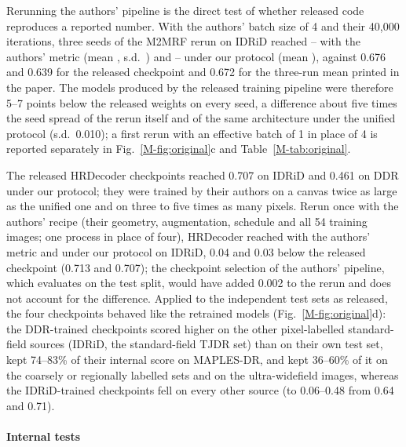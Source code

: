 Rerunning the authors' pipeline is the direct test of whether released code reproduces a reported number. With the authors' batch size of 4 and their 40,000 iterations, three seeds of the M2MRF rerun on IDRiD reached -- with the authors' metric (mean , s.d.\ ) and -- under our protocol (mean ), against 0.676 and 0.639 for the released checkpoint and 0.672 for the three-run mean printed in the paper. The models produced by the released training pipeline were therefore 5--7 points below the released weights on every seed, a difference about five times the seed spread of the rerun itself and of the same architecture under the unified protocol (s.d.\ 0.010); a first rerun with an effective batch of 1 in place of 4 is reported separately in Fig.~\ref{M-fig:original}c and Table~\ref{M-tab:original}.

The released HRDecoder checkpoints reached 0.707 on IDRiD and 0.461 on DDR under our protocol; they were trained by their authors on a canvas twice as large as the unified one and on three to five times as many pixels. Rerun once with the authors' recipe (their geometry, augmentation, schedule and all 54 training images; one process in place of four), HRDecoder reached  with the authors' metric and  under our protocol on IDRiD, 0.04 and 0.03 below the released checkpoint (0.713 and 0.707); the checkpoint selection of the authors' pipeline, which evaluates on the test split, would have added 0.002 to the rerun and does not account for the difference. Applied to the independent test sets as released, the four checkpoints behaved like the retrained models (Fig.~\ref{M-fig:original}d): the DDR-trained checkpoints scored higher on the other pixel-labelled standard-field sources (IDRiD, the standard-field TJDR set) than on their own test set, kept 74--83\% of their internal score on MAPLES-DR, and kept 36--60\% of it on the coarsely or regionally labelled sets and on the ultra-widefield images, whereas the IDRiD-trained checkpoints fell on every other source (to 0.06--0.48 from 0.64 and 0.71).

\paragraph{Internal tests}

